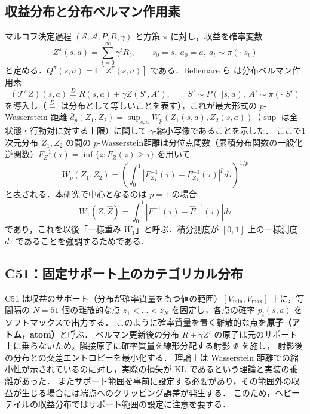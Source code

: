 \documentclass[a4paper,10pt]{jsarticle}
\theoremstyle{definition}
\newcommand{\Wone}{W_1}
\newcommand{\Finv}{F^{-1}}
\newcommand{\Fhinv}{\hat{F}^{-1}}
\newcommand{\E}{\mathbb{E}}
\begin{document}
\subsection{収益分布と分布ベルマン作用素}
マルコフ決定過程 $(\mathcal{S},\mathcal{A},P,R,\gamma)$ と方策 $\pi$ に対し，収益を確率変数
\begin{equation}
  Z^\pi(s,a)=\sum_{t=0}^{\infty}\gamma^t R_t,\qquad s_0=s,\ a_0=a,\ a_t\sim\pi(\cdot|s_t)
\end{equation}
と定める．$Q^\pi(s,a)=\E[Z^\pi(s,a)]$ である．Bellemare ら \cite{bellemare2017c51} は分布ベルマン作用素
\begin{equation}
  (\mathcal{T}^\pi Z)(s,a)\overset{D}{=}R(s,a)+\gamma Z(S',A'),\qquad S'\sim P(\cdot|s,a),\ A'\sim\pi(\cdot|S')
\end{equation}
を導入し（$\overset{D}{=}$ は分布として等しいことを表す），これが最大形式の $p$-Wasserstein 距離 $\bar d_p(Z_1,Z_2)=\sup_{s,a}W_p(Z_1(s,a),Z_2(s,a))$（$\sup$ は全状態・行動対に対する上限）に関して
$\gamma$-縮小写像であることを示した．
ここで1次元分布 $Z_1,Z_2$ の間の $p$-Wasserstein距離は分位点関数（累積分布関数の一般化逆関数）$F^{-1}_{Z}(\tau)=\inf\{z:F_Z(z)\ge\tau\}$ を用いて
\begin{equation}
  W_p(Z_1,Z_2)=\left(\int_0^1\left|F_{Z_1}^{-1}(\tau)-F_{Z_2}^{-1}(\tau)\right|^p d\tau\right)^{1/p}
  \label{eq:wp}
\end{equation}
と表される．本研究で中心となるのは $p=1$ の場合
\begin{equation}
  \Wone(Z,\hat Z)=\int_0^1\left|\Finv(\tau)-\Fhinv(\tau)\right|d\tau
  \label{eq:w1}
\end{equation}
であり，これを以後「一様重み $\Wone$」と呼ぶ．積分測度が $[0,1]$ 上の一様測度 $d\tau$ であることを強調するためである．

\subsection{C51：固定サポート上のカテゴリカル分布}
C51 \cite{bellemare2017c51} は収益のサポート（分布が確率質量をもつ値の範囲）$[V_{\min},V_{\max}]$ 上に，等間隔の $N=51$ 個の離散的な点
$z_1<\dots<z_N$ を固定し，各点の確率 $p_i(s,a)$ をソフトマックスで出力する．
このように確率質量を置く離散的な点を\textbf{原子（アトム，atom）}と呼ぶ．
ベルマン更新後の分布 $R+\gamma Z'$ の原子は元のサポート上に乗らないため，隣接原子に確率質量を線形分配する射影 $\Phi$ を施し，
射影後の分布との交差エントロピーを最小化する．
理論上は Wasserstein 距離での縮小性が示されているのに対し，実際の損失が KL であるという理論と実装の乖離があった．
またサポート範囲を事前に設定する必要があり，その範囲外の収益が生じる場合には端点へのクリッピング誤差が発生する．
このため，ヘビーテイルの収益分布ではサポート範囲の設定に注意を要する．
\end{document}
